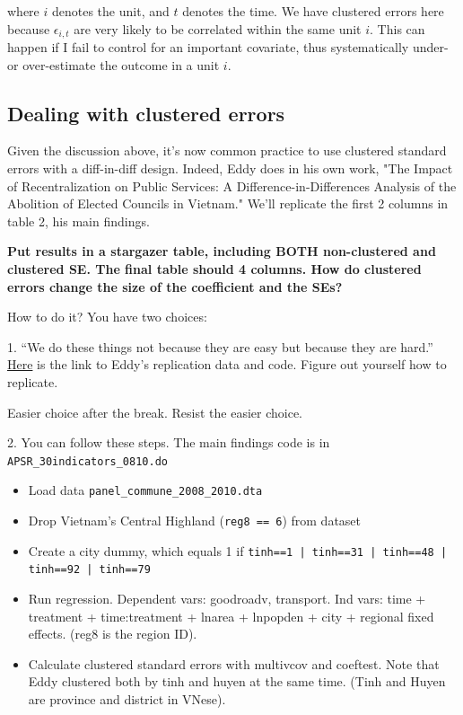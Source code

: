 \documentclass{article}\usepackage[]{graphicx}\usepackage[]{color}
\begin{document}
where $i$ denotes the unit, and $t$ denotes the time. We have clustered errors here because $\epsilon_{i, t}$ are very likely to be correlated within the same unit $i$. This can happen if I fail to control for an important covariate, thus systematically under- or over-estimate the outcome in a unit $i$.

\subsection{Dealing with clustered errors}

Given the discussion above, it's now common practice to use clustered standard errors with a diff-in-diff design. Indeed, Eddy does in his own work, "The Impact of Recentralization on Public Services: A Difference-in-Differences Analysis of the Abolition of Elected Councils in Vietnam." We'll replicate the first 2 columns in table 2, his main findings.

\textbf{Put results in a stargazer table, including BOTH non-clustered and clustered SE. The final table should 4 columns. How do clustered errors change the size of the coefficient and the SEs?}

How to do it? You have two choices:

1. ``We do these things not because they are easy but because they are hard.'' \href{https://dataverse.harvard.edu/dataset.xhtml?persistentId=doi:10.7910/DVN/IUG2C4}{Here} is the link to Eddy's replication data and code. Figure out yourself how to replicate.

Easier choice after the break. Resist the easier choice.

\pagebreak

2. You can follow these steps. The main findings code is in \verb`APSR_30indicators_0810.do`

\begin{itemize}
\item Load data \verb`panel_commune_2008_2010.dta`
\item Drop Vietnam's Central Highland (\verb`reg8 == 6`) from dataset
\item Create a city dummy, which equals 1 if \verb`tinh==1 | tinh==31 | tinh==48 | tinh==92 | tinh==79`
\item Run regression. Dependent vars: goodroadv, transport. Ind vars: time + treatment + time:treatment + lnarea + lnpopden + city + regional fixed effects. (reg8 is the region ID).
\item Calculate clustered standard errors with multivcov and coeftest. Note that Eddy clustered both by tinh and huyen at the same time. (Tinh and Huyen are province and district in VNese).
\end{itemize}
\end{document}
